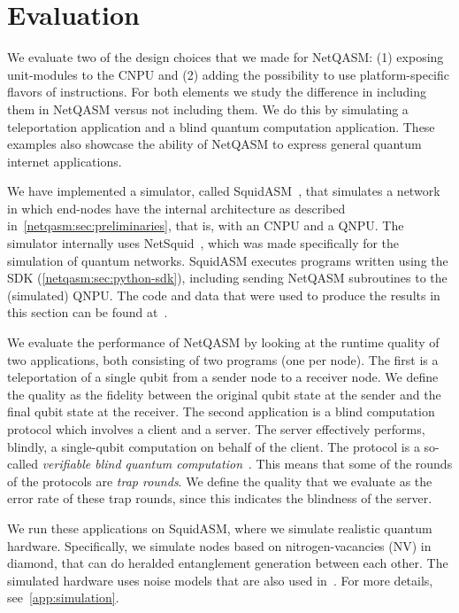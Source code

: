 \section{Evaluation}
\label{netqasm:sec:evaluation}
We evaluate two of the design choices that we made for \ac{NetQASM}:
    (1) exposing unit-modules to the \ac{CNPU} and
    (2) adding the possibility to use platform-specific flavors of instructions.
For both elements we study the difference in including them in \ac{NetQASM} versus not including them.
We do this by simulating a teleportation application and a blind quantum computation application.
These examples also showcase the ability of \ac{NetQASM} to express general quantum internet applications.

We have implemented a simulator, called SquidASM~\cite{git_squidasm}, that simulates a network in which end-nodes have the internal architecture as described in~\cref{netqasm:sec:preliminaries}, that is, with an \ac{CNPU} and a \ac{QNPU}.
The simulator internally uses NetSquid~\cite{netsquid}, which was made specifically for the simulation of quantum networks.
SquidASM executes programs written using the SDK (\cref{netqasm:sec:python-sdk}), including sending \ac{NetQASM} subroutines to the (simulated) \ac{QNPU}.
The code and data that were used to produce the results in this section can be found at~\cite{git_netqasm_paper_data}.

We evaluate the performance of \ac{NetQASM} by looking at the runtime quality of two applications, both consisting of two programs (one per node).
The first is a teleportation of a single qubit from a sender node to a receiver node.
We define the quality as the fidelity between the original qubit state at the sender and the final qubit state at the receiver.
The second application is a blind computation protocol which involves a client and a server.
The server effectively performs, blindly, a single-qubit computation on behalf of the client.
The protocol is a so-called \textit{verifiable blind quantum computation}~\cite{fitzsimons2017unconditionally}.
This means that some of the rounds of the protocols are \textit{trap rounds}.
We define the quality that we evaluate as the error rate of these trap rounds, since this indicates the blindness of the server.

We run these applications on SquidASM, where we simulate realistic quantum hardware.
Specifically, we simulate nodes based on nitrogen-vacancies (NV) in diamond, that can do heralded entanglement generation between each other.
The simulated hardware uses noise models that are also used in~\cite{coopmans2021netsquid}.
For more details, see~\cref{app:simulation}.

